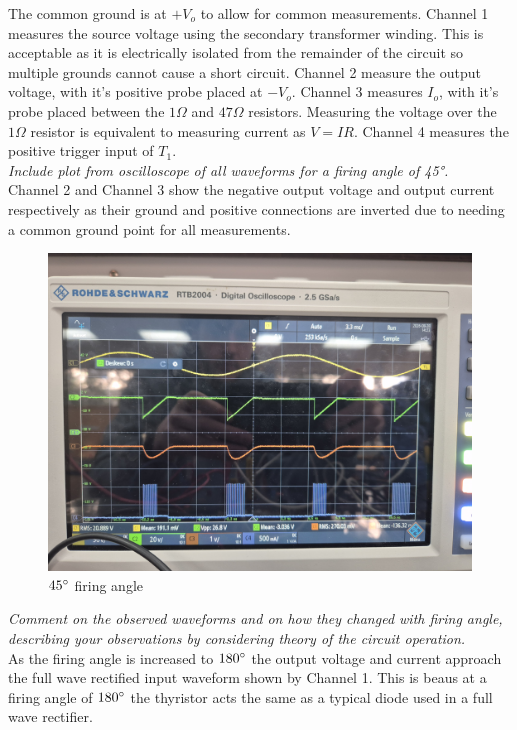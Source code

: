 \documentclass[12pt,a4paper]{article}
\begin{document}
The common ground is at $+V_o$ to allow for common measurements. Channel 1 measures the source voltage using the secondary transformer winding. This is acceptable as it is electrically isolated from the remainder of the circuit so multiple grounds cannot cause a short circuit. Channel 2 measure the output voltage, with it's positive probe placed at $-V_o$. Channel 3 measures $I_o$, with it's probe placed between the $1\Omega$ and $47\Omega$ resistors. Measuring the voltage over the $1\Omega$ resistor is equivalent to measuring current as $V=IR$. Channel 4 measures the positive trigger input of $T_1$. \\ 

\textit{Include plot from oscilloscope of all waveforms for a firing angle of 45°.}\\

Channel 2 and Channel 3 show the negative output voltage and output current respectively as their ground and positive connections are inverted due to needing a common ground point for all measurements. 
\begin{figure}[H]
        \centering
	\includegraphics[width=0.7\columnwidth]{Images/20250828_143455.jpg}
	\caption{$45\degree$ firing angle}
	\label{fig:45 degree firing angle}
\end{figure}

\textit{Comment on the observed waveforms and on how they changed with firing angle, describing your observations by considering theory of the circuit operation.}\\

As the firing angle is increased to $180\degree$ the output voltage and current approach the full wave rectified input waveform shown by Channel 1. This is beaus at a firing angle of $180\degree$ the thyristor acts the same as a typical diode used in a full wave rectifier.\\
\end{document}
